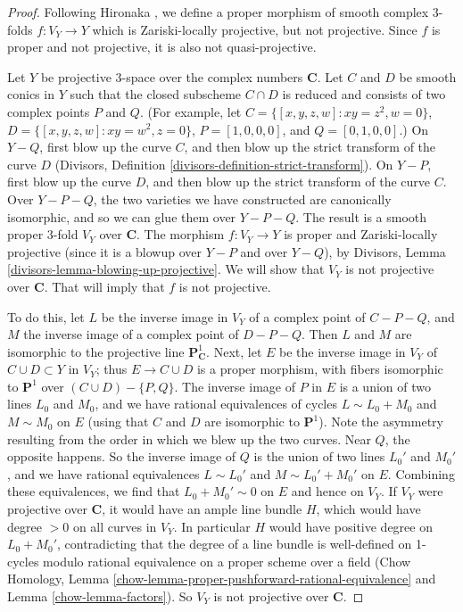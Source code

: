 \begin{proof}
Following Hironaka \cite[Example B.3.4.1]{H},
we define a proper morphism of smooth complex 3-folds
$f:V_Y\to Y$
which is Zariski-locally projective, but not projective. Since $f$ is proper
and not projective, it is also not quasi-projective.

\medskip\noindent
Let $Y$ be projective 3-space over the complex numbers ${\mathbf C}$.
Let $C$ and $D$ be smooth conics in $Y$ such
that the closed subscheme $C\cap D$ is reduced and consists
of two complex points $P$ and $Q$. (For example,
let $C=\{ [x,y,z,w]: xy=z^2, w=0\}$, $D=\{ [x,y,z,w]:
xy=w^2, z=0\}$, $P=[1,0,0,0]$,
and $Q=[0,1,0,0]$.) 
On $Y-Q$, first blow up the curve $C$, and then blow
up the strict transform of the curve $D$ (Divisors, Definition 
\ref{divisors-definition-strict-transform}). On $Y-P$, first blow up
the curve $D$, and then blow up the strict transform of the curve
$C$. Over $Y-P-Q$, the two varieties we have constructed are canonically
isomorphic, and so we can glue them over $Y-P-Q$. The result
is a smooth proper 3-fold $V_Y$ over ${\mathbf C}$. The morphism
$f:V_Y\to Y$ is proper and Zariski-locally projective (since
it is a blowup over $Y-P$ and over $Y-Q$), by Divisors,
Lemma \ref{divisors-lemma-blowing-up-projective}. We will show that
$V_Y$ is not projective over ${\mathbf C}$. That will imply that
$f$ is not projective.

\medskip\noindent
To do this, let $L$ be the inverse image in $V_Y$ of a complex point
of $C-P-Q$, and $M$ the inverse image of a complex point of $D-P-Q$.
Then $L$ and $M$ are isomorphic to the projective line
${\mathbf P}^1_{{\mathbf C}}$. 
Next, let $E$ be the inverse image in $V_Y$ of $C\cup D\subset Y$ in $V_Y$;
thus $E\rightarrow C\cup D$ is a proper morphism, with fibers
isomorphic to ${\mathbf P}^1$ over $(C\cup D)-\{P,Q\}$.
The inverse
image of $P$ in $E$ is a union of two lines $L_0$ and $M_0$, and we have
rational equivalences of cycles $L\sim L_0+M_0$ and $M\sim M_0$ on $E$
(using that $C$ and $D$ are isomorphic to ${\mathbf P}^1$).
Note the asymmetry resulting from the order in which we blew
up the two curves. Near $Q$, the opposite happens. So the inverse image
of $Q$ is the union of two lines $L_0'$ and $M_0'$, and we have
rational equivalences $L\sim L_0'$ and $M\sim L_0'+M_0'$ on $E$.
Combining these equivalences, we find that $L_0+M_0'\sim 0$
on $E$ and hence on $V_Y$. If $V_Y$ were projective over ${\mathbf C}$,
it would have
an ample line bundle $H$, which would have degree $> 0$ on all curves
in $V_Y$. In particular $H$ would have positive degree on $L_0+M_0'$,
contradicting that the degree of a line bundle is well-defined
on 1-cycles modulo rational equivalence on a proper scheme
over a field (Chow Homology,
Lemma \ref{chow-lemma-proper-pushforward-rational-equivalence}
and Lemma \ref{chow-lemma-factors}).
So $V_Y$ is not projective over ${\mathbf C}$.
\end{proof}

